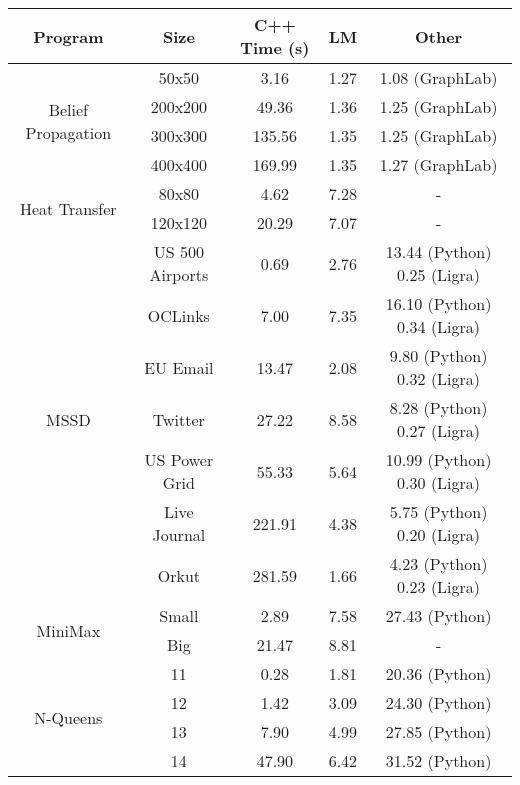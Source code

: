 \begin{tabular}{c | c || c | c | c} \hline
	\textbf{Program} & \textbf{Size} & \textbf{C++ Time} (s) & \textbf{LM} & \textbf{Other} \\ \hline \hline
	\multirow{4}{*}{Belief Propagation}  & 50x50 &  3.16  &  1.27  &  1.08 (GraphLab) \\
		 & 200x200 &  49.36  &  1.36  &  1.25 (GraphLab) \\
		 & 300x300 &  135.56  &  1.35  &  1.25 (GraphLab) \\
		 & 400x400 &  169.99  &  1.35  &  1.27 (GraphLab) \\
	\hline
	\multirow{2}{*}{Heat Transfer}  & 80x80 &  4.62  &  7.28  &  - \\
		 & 120x120 &  20.29  &  7.07  &  - \\
	\hline
	\multirow{7}{*}{MSSD}  & US 500 Airports &  0.69  &  2.76  &  13.44 (Python) 0.25 (Ligra) \\
		 & OCLinks &  7.00  &  7.35  &  16.10 (Python) 0.34 (Ligra) \\
		 & EU Email &  13.47  &  2.08  &  9.80 (Python) 0.32 (Ligra) \\
		 & Twitter &  27.22  &  8.58  &  8.28 (Python) 0.27 (Ligra) \\
		 & US Power Grid &  55.33  &  5.64  &  10.99 (Python) 0.30 (Ligra) \\
		 & Live Journal &  221.91  &  4.38  &  5.75 (Python) 0.20 (Ligra) \\
		 & Orkut &  281.59  &  1.66  &  4.23 (Python) 0.23 (Ligra) \\
	\hline
	\multirow{2}{*}{MiniMax}  & Small &  2.89  &  7.58  &  27.43 (Python) \\
		 & Big &  21.47  &  8.81  &  - \\
	\hline
	\multirow{4}{*}{N-Queens}  & 11 &  0.28  &  1.81  &  20.36 (Python) \\
		 & 12 &  1.42  &  3.09  &  24.30 (Python) \\
		 & 13 &  7.90  &  4.99  &  27.85 (Python) \\
		 & 14 &  47.90  &  6.42  &  31.52 (Python) \\
	\hline
\end{tabular}
